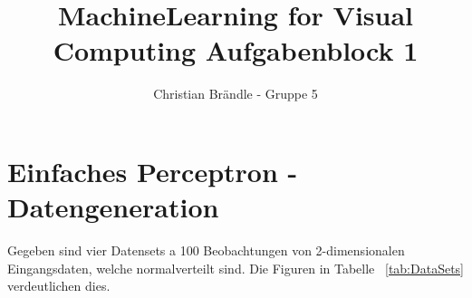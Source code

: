 \documentclass[]{report}
\title{MachineLearning for Visual Computing Aufgabenblock 1}
\author{Christian Br\"andle - Gruppe 5}
\begin{document}
\maketitle


\section{Einfaches Perceptron - Datengeneration}


Gegeben sind vier Datensets a 100 Beobachtungen von 2-dimensionalen Eingangsdaten, welche normalverteilt sind. Die Figuren in Tabelle ~\ref{tab:DataSets} verdeutlichen dies.
\end{document}
